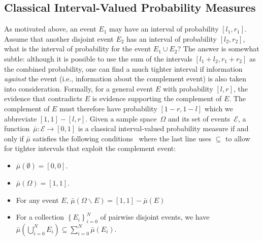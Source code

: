 \documentclass{article}
\theoremstyle{remark}
\newcommand{\events}{\ensuremath{\mathcal{E}}}
\begin{document}
\subsection{Classical Interval-Valued Probability Measures}

As motivated above, an event $E_{1}$ may have an interval of
probability $[l_{1},r_{1}]$. Assume that another disjoint event
$E_{2}$ has an interval of probability $[l_{2},r_{2}]$, what is the
interval of probability for the event $E_{1}\cup E_{2}$? The answer is
somewhat subtle: although it is possible to use the sum of the
intervals $[l_{1}+l_{2},r_{1}+r_{2}]$ as the combined probability, one
can find a much tighter interval if information \emph{against} the
event (i.e., information about the complement event) is also taken
into consideration. Formally, for a general event $E$ with probability
$[l,r]$, the evidence that contradicts $E$ is evidence supporting the
complement of $E$.  The complement of $E$ must therefore have
probability $\left[1-r,1-l\right]$ which we abbreviate
$\left[1,1\right]-\left[l,r\right]$.  Given a sample space~$\Omega$
and its set of events~$\events$, a
function~$\bar{\mu}:\events\rightarrow[0,1]$ is a classical
interval-valued probability measure if and only if $\bar{\mu}$
satisfies the following conditions~\cite{JamisonLodwick2004} where the
last line uses $\subseteq$ to allow for tighter intervals that exploit
the complement event:
\begin{itemize}
\item $\bar{\mu}(\emptyset)=[0,0]$.
\item $\bar{\mu}(\Omega)=[1,1]$. 
\item For any event $E$,
  $\bar{\mu}\left(\Omega\backslash E\right)=\left[1,1\right]-\bar{\mu}\left(E\right)$
\item For a collection $\left\{ E_{i}\right\} _{i=0}^{N}$ of pairwise
  disjoint events, we have
  $\bar{\mu}\left(\bigcup_{i=0}^{N}E_{i}\right)\subseteq\sum_{i=0}^{N}\bar{\mu}\left(E_{i}\right)$.
\end{itemize}
\end{document}
